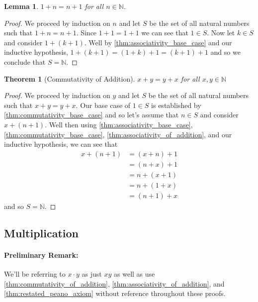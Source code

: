 \documentclass{article}
\theoremstyle{definition}
\theoremstyle{definition}
\theoremstyle{plain}
\theoremstyle{remark}
\theoremstyle{plain}
\newtheorem{theorem}{Theorem}[section]
\theoremstyle{remark}
\theoremstyle{plain}
\newtheorem{lemma}{Lemma}[section]
\theoremstyle{plain}
\theoremstyle{plain}
\theoremstyle{plain}
\begin{document}
\begin{lemma}
  \( 1 + n = n + 1 \) for all \( n \in \mathbb{N} \).
  \label{thm:commutativity_base_case}
\end{lemma}

\begin{proof}
  We proceed by induction on \( n \) and let \( S \) be the set of all natural 
  numbers such that \( 1 + n = n + 1 \). Since \( 1 + 1 = 1 + 1 \) we can see 
  that \( 1 \in S \). Now let \( k \in S \) and consider \( 1 + (k + 1)\). Well
  by \autoref{thm:associativity_base_case} and our inductive hypothesis, 
  \( 1 + (k + 1) = (1 + k) + 1 = (k + 1) + 1 \) and so we conclude that 
  \( S = \mathbb{N} \).  
\end{proof}

\begin{theorem}[Commutativity of Addition]
  \( x + y = y + x \) for all \( x, y \in \mathbb{N} \) 
  \label{thm:commutativity_of_addition}
\end{theorem}

\begin{proof}
  We proceed by induction on \( y \) and let \( S \) be the set of all natural 
  numbers such that \( x + y = y + x \). Our base case of \( 1 \in S \) is 
  established by \autoref{thm:commutativity_base_case} and so let's assume that 
  \( n \in S \) and consider \( x + (n + 1) \). Well then using 
  \autoref{thm:associativity_base_case}, \autoref{thm:commutativity_base_case}, 
  \autoref{thm:associativity_of_addition}, 
  and our inductive hypothesis, we can see that 
  \begin{align*}
    x + (n + 1) &= (x + n) + 1 \\
                &= (n + x) + 1 \\ 
                &= n + (x + 1) \\
                &= n + (1 + x) \\
                &= (n + 1) + x
  \end{align*}
  and so \( S = \mathbb{N} \).
\end{proof}

\newpage

\subsection{Multiplication}

\paragraph{Preliminary Remark:}
We'll be referring to \( x \cdot y \) as just \( xy \) as well as use 
\autoref{thm:commutativity_of_addition}, 
\autoref{thm:associativity_of_addition}, and \autoref{thm:restated_peano_axiom} 
without reference throughout these proofs.
\end{document}
